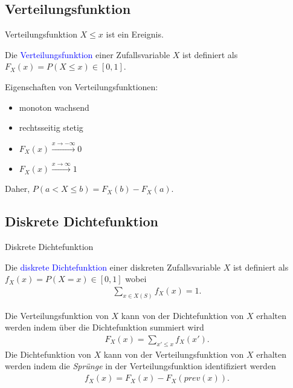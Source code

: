 \documentclass{beamer}
\def\padding{\vspace{0.5cm}}
\def\spadding{\vspace{0.25cm}}
\def\b{\textcolor{blue}}
\begin{document}
\subsection{Verteilungsfunktion}
\begin{frame}{Verteilungsfunktion}
    $X \leq x$ ist ein Ereignis.\pause\par\padding
    \begin{definition}
        Die \b{Verteilungsfunktion} einer Zufallsvariable $X$ ist definiert als $F_X(x) = P(X \leq x) \in [0,1]$.
    \end{definition}\pause\par\spadding
    Eigenschaften von Verteilungsfunktionen:\pause
    \begin{itemize}
        \item monoton wachsend\pause
        \item rechtsseitig stetig\pause
        \item $F_X(x) \xrightarrow{x \to - \infty} 0$\pause
        \item $F_X(x) \xrightarrow{x \to \infty} 1$
    \end{itemize}\pause\padding
    Daher, $P(a < X \leq b) = F_X(b) - F_X(a)$.
\end{frame}

\subsection{Diskrete Dichtefunktion}
\begin{frame}{Diskrete Dichtefunktion}
    \begin{definition}
        Die \b{diskrete Dichtefunktion} einer diskreten Zufallsvariable $X$ ist definiert als $f_X(x) = P(X = x) \in [0,1]$ wobei
        \begin{align*}
            \sum_{x \in X(S)} f_X(x) = 1.
        \end{align*}
    \end{definition}
\end{frame}

\begin{frame}
    Die Verteilungsfunktion von $X$ kann von der Dichtefunktion von $X$ erhalten werden indem über die Dichtefunktion summiert wird
    \begin{align*}
        F_X(x) = \sum_{x' \leq x} f_X(x').
    \end{align*}\pause
    Die Dichtefunktion von $X$ kann von der Verteilungsfunktion von $X$ erhalten werden indem die \textit{Sprünge} in der Verteilungsfunktion identifiziert werden
    \begin{align*}
        f_X(x) = F_X(x) - F_X(prev(x)).
    \end{align*}
\end{frame}
\end{document}
